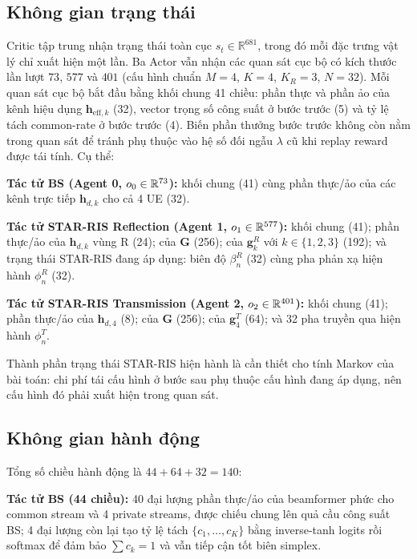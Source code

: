 \subsection{Không gian trạng thái}

Critic tập trung nhận trạng thái toàn cục $s_t\in\mathbb{R}^{681}$, trong đó mỗi đặc trưng vật lý chỉ xuất hiện một lần. Ba Actor vẫn nhận các quan sát cục bộ có kích thước lần lượt $73$, $577$ và $401$ (cấu hình chuẩn $M=4$, $K=4$, $K_R=3$, $N=32$).
Mỗi quan sát cục bộ bắt đầu bằng khối chung 41 chiều: phần thực và phần
ảo của kênh hiệu dụng $\mathbf{h}_{\text{eff},k}$ (32), vector trọng số
công suất ở bước trước (5) và tỷ lệ tách common-rate ở bước trước (4).
Biến phần thưởng bước trước không còn nằm trong quan sát để tránh phụ
thuộc vào hệ số đối ngẫu $\lambda$ cũ khi replay reward được tái tính.
Cụ thể:

\textbf{Tác tử BS (Agent 0, $o_0 \in \mathbb{R}^{73}$):} khối chung (41) cùng
phần thực/ảo của các kênh trực tiếp $\mathbf{h}_{d,k}$ cho cả 4 UE (32).

\textbf{Tác tử STAR-RIS Reflection (Agent 1, $o_1 \in \mathbb{R}^{577}$):} khối
chung (41); phần thực/ảo của $\mathbf{h}_{d,k}$ vùng R (24); của $\mathbf{G}$ (256);
của $\mathbf{g}_{k}^R$ với $k \in \{1,2,3\}$ (192); và trạng thái
STAR-RIS đang áp dụng: biên độ $\beta_n^R$ (32) cùng pha phản xạ hiện
hành $\phi_n^R$ (32).

\textbf{Tác tử STAR-RIS Transmission (Agent 2, $o_2 \in \mathbb{R}^{401}$):} khối
chung (41); phần thực/ảo của $\mathbf{h}_{d,4}$ (8); của $\mathbf{G}$ (256); của
$\mathbf{g}_{4}^T$ (64); và 32 pha truyền qua hiện hành $\phi_n^T$.

Thành phần trạng thái STAR-RIS hiện hành là cần thiết cho tính Markov
của bài toán: chi phí tái cấu hình ở bước sau phụ thuộc cấu hình đang
áp dụng, nên cấu hình đó phải xuất hiện trong quan sát.

\subsection{Không gian hành động}

Tổng số chiều hành động là $44 + 64 + 32 = 140$:

\textbf{Tác tử BS (44 chiều):} 40 đại lượng phần thực/ảo của beamformer
phức cho common stream và 4 private streams, được chiếu chung lên quả cầu
công suất BS; 4 đại lượng còn lại tạo tỷ lệ tách $\{c_1,\ldots,c_K\}$ bằng
inverse-tanh logits rồi softmax để đảm bảo $\sum c_k = 1$ và vẫn tiếp cận
tốt biên simplex.

